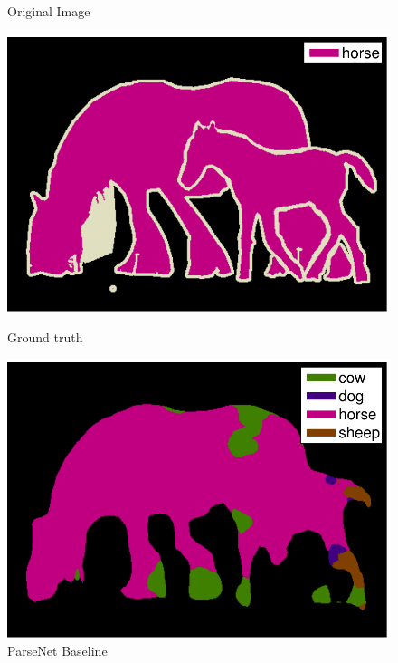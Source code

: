 \documentclass{article} %
\begin{document}
\begin{figure}
\begin{subtable}[b]{0.24\linewidth}
		\caption{Original Image}
	\end{subtable}
	\begin{subtable}[b]{0.24\linewidth}
		\includegraphics[width=\linewidth]{figure/2008_007945_gt-eps-converted-to.pdf}
		\caption{Ground truth}
	\end{subtable}
	\begin{subtable}[b]{0.24\linewidth}
		\includegraphics[width=\linewidth]{figure/2008_007945_base-eps-converted-to.pdf}
		\caption{ParseNet Baseline}
	\end{subtable}
	\begin{subtable}[b]{0.24\linewidth}

\end{subtable}
\end{figure}
\end{document}
